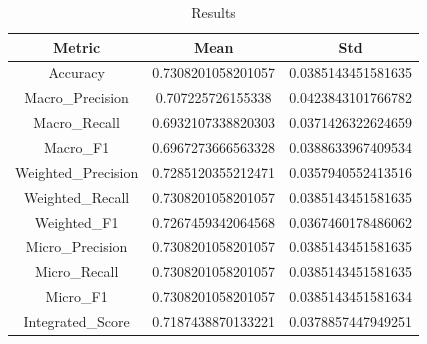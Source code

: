 \begin{table}[htbp]
\centering
\caption{Results}
\label{tab:csv}
\small
\setlength{\tabcolsep}{4pt}
\begin{tabular}{|c|c|c|}
\hline
Metric & Mean & Std \\
\hline
Accuracy & 0.7308201058201057 & 0.0385143451581635 \\
Macro_Precision & 0.707225726155338 & 0.0423843101766782 \\
Macro_Recall & 0.6932107338820303 & 0.0371426322624659 \\
Macro_F1 & 0.6967273666563328 & 0.0388633967409534 \\
Weighted_Precision & 0.7285120355212471 & 0.0357940552413516 \\
Weighted_Recall & 0.7308201058201057 & 0.0385143451581635 \\
Weighted_F1 & 0.7267459342064568 & 0.0367460178486062 \\
Micro_Precision & 0.7308201058201057 & 0.0385143451581635 \\
Micro_Recall & 0.7308201058201057 & 0.0385143451581635 \\
Micro_F1 & 0.7308201058201057 & 0.0385143451581634 \\
Integrated_Score & 0.7187438870133221 & 0.0378857447949251 \\
\hline
\end{tabular}
\end{table}